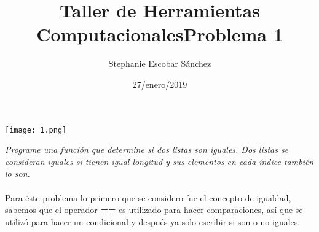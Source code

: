 \documentclass{article}
\title{\Huge Taller de Herramientas Computacionales}
\author{Stephanie Escobar Sánchez}
\date{27/enero/2019}
\begin{document}
	\maketitle
	\begin{center}
		\texttt{[image: 1.png]}	
	\end{center}
	\newpage
	\begin{center}
		\title {\Huge Problema 1} 
	\end{center}

\textit{Programe una función que determine si dos listas son iguales. Dos listas se
	consideran iguales si tienen igual longitud y sus elementos en cada índice
	también lo son.}\\
\\
Para éste problema lo primero que se considero fue el concepto de igualdad, sabemos que el operador \textbf{==} es utilizado para hacer comparaciones, así que se utilizó  para hacer un condicional y después ya solo escribir si son o no iguales.
\end{document}
